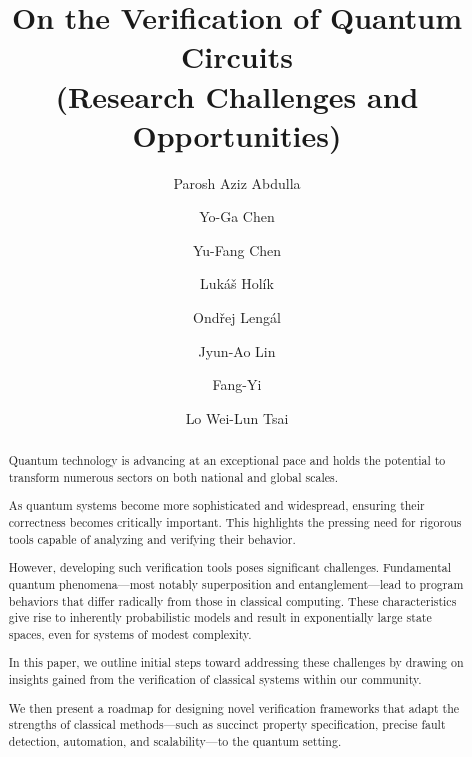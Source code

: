 

\title{On the Verification of Quantum Circuits\\
(Research Challenges and Opportunities) }

\author{
Parosh Aziz Abdulla
\and
Yo-Ga Chen
\and
Yu-Fang Chen
\and
Luk\'a\v{s} Hol\'ik
\and
Ond\v{r}ej Leng\'{a}l 
\and 
Jyun-Ao Lin
\and
Fang-Yi 
\and
Lo Wei-Lun Tsai
}

\maketitle
\begin{abstract}
Quantum technology is advancing at an exceptional pace and holds the potential to transform numerous sectors on both national and global scales. 
 
As quantum systems become more sophisticated and widespread, ensuring their correctness becomes critically important. This highlights the pressing need for rigorous tools capable of analyzing and verifying their behavior.
 
However, developing such verification tools poses significant challenges. Fundamental quantum phenomena—most notably superposition and entanglement—lead to program behaviors that differ radically from those in classical computing. These characteristics give rise to inherently probabilistic models and result in exponentially large state spaces, even for systems of modest complexity.
 

In this paper, we outline initial steps toward addressing these challenges by drawing on insights gained from the verification of classical systems within our community.
 
We then present a roadmap for designing novel verification frameworks that adapt the strengths of classical methods—such as succinct property specification, precise fault detection, automation, and scalability—to the quantum setting.
 
\end{abstract}
